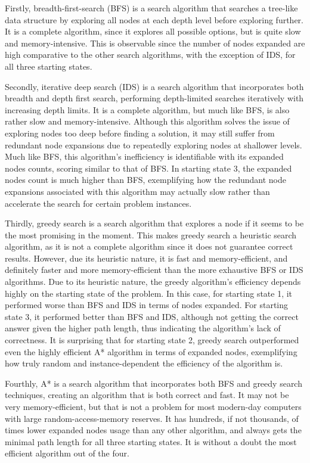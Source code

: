 \documentclass{article}
\begin{document}
Firstly, breadth-first-search (BFS) is a search algorithm that searches a tree-like data structure by exploring all nodes at each depth level before exploring further. It is a complete algorithm, since it explores all possible options, but is quite slow and memory-intensive. This is observable since the number of nodes expanded are high comparative to the other search algorithms, with the exception of IDS, for all three starting states.

Secondly, iterative deep search (IDS) is a search algorithm that incorporates both breadth and depth first search, performing depth-limited searches iteratively with increasing depth limits. It is a complete algorithm, but much like BFS, is also rather slow and memory-intensive. Although this algorithm solves the issue of exploring nodes too deep before finding a solution, it may still suffer from redundant node expansions due to repeatedly exploring nodes at shallower levels. Much like BFS, this algorithm’s inefficiency is identifiable with its expanded nodes counts, scoring similar to that of BFS. In starting state 3, the expanded nodes count is much higher than BFS, exemplifying how the redundant node expansions associated with this algorithm may actually slow rather than accelerate the search for certain problem instances.

Thirdly, greedy search is a search algorithm that explores a node if it seems to be the most promising in the moment. This makes greedy search a heuristic search algorithm, as it is not a complete algorithm since it does not guarantee correct results. However, due its heuristic nature, it is fast and memory-efficient, and definitely faster and more memory-efficient than the more exhaustive BFS or IDS algorithms. Due to its heuristic nature, the greedy algorithm’s efficiency depends highly on the starting state of the problem. In this case, for starting state 1, it performed worse than BFS and IDS in terms of nodes expanded. For starting state 3, it performed better than BFS and IDS, although not getting the correct answer given the higher path length, thus indicating the algorithm’s lack of correctness. It is surprising that for starting state 2, greedy search outperformed even the highly efficient A* algorithm in terms of expanded nodes, exemplifying how truly random and instance-dependent the efficiency of the algorithm is.

Fourthly, A* is a search algorithm that incorporates both BFS and greedy search techniques, creating an algorithm that is both correct and fast. It may not be very memory-efficient, but that is not a problem for most modern-day computers with large random-access-memory reserves. It has hundreds, if not thousands, of times lower expanded nodes usage than any other algorithm, and always gets the minimal path length for all three starting states. It is without a doubt the most efficient algorithm out of the four.
\end{document}
